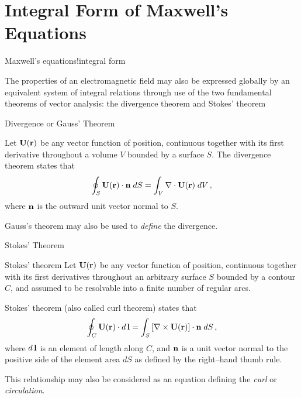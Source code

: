\documentclass[handout,10pt]{beamer}
\begin{document}
\section{Integral  Form of Maxwell's Equations}
\begin{frame}[fragile]{Maxwell's equations!integral form}

The properties of an electromagnetic field  may also be expressed
globally by an equivalent system of integral relations through use
of the two fundamental theorems of vector analysis: the divergence
theorem and Stokes' theorem

\pause
\alert{Divergence or Gauss' Theorem}

%
Let ${\mathbf{U}}({\mathbf{r}})$ be any vector function of position,
continuous together with its first derivative throughout a volume
$V$ bounded by a surface $S$. The divergence theorem states that
%
\begin{equation}
\oint_{S} {\mathbf{U}}({\mathbf{r}}) \cdot {\mathbf{n}} \; dS = \int_{V}
\nabla \cdot {\mathbf{U}}({\mathbf{r}})  \; dV\,, \label{divergenceq}
\end{equation}
%
where ${\bf n }$ is the outward unit vector normal to $S$. 

\pause

\alert{Gauss's theorem may also be used to \emph{define} the divergence}.


\end{frame}



\begin{frame}[fragile]{Stokes' Theorem}

\alert{Stokes' theorem}
%
Let ${\mathbf{U}}({\mathbf{r}})$ be any vector function of position,
continuous together with its first derivatives throughout an
arbitrary surface $S$ bounded by a contour $C$, and assumed to be
resolvable into a finite number of regular arcs. 

\pause
Stokes' theorem
(also called curl theorem) states that
%
\begin{equation}
\oint_{C} {\mathbf{U}}({\mathbf{r}}) \cdot d\, \mathbf{l}  = \int_{S} \left[
\nabla \times {\mathbf{U}}({\mathbf{r}})\right] \cdot {\mathbf{n}} \; dS \,,
\label{curleq}
\end{equation}
%
where $d\,\mathbf{l}$ is an element of length along $C$, and
${\mathbf{n}}$ is a unit vector normal to the positive side of the
element area $dS$ as defined by the right--hand thumb rule. 

\pause
\alert{This
relationship may also be considered as an equation defining the
\emph{curl} or \emph{circulation}}.


\end{frame}
\end{document}
